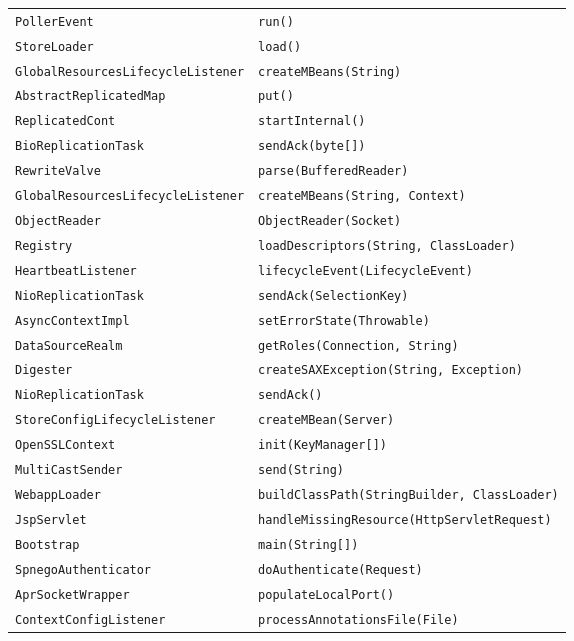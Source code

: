 \begin{center}
\begin{longtable}{ll}
\lstinline/PollerEvent/&{\lstinline/run()/}\\
\lstinline/StoreLoader/&{\lstinline/load()/}\\
\lstinline/GlobalResourcesLifecycleListener/&{\lstinline/createMBeans(String)/}\\
\lstinline/AbstractReplicatedMap/&{\lstinline/put()/}\\
\lstinline/ReplicatedCont/&{\lstinline/startInternal()/}\\
\lstinline/BioReplicationTask/&{\lstinline/sendAck(byte[])/}\\
\lstinline/RewriteValve/&{\lstinline/parse(BufferedReader)/}\\
\lstinline/GlobalResourcesLifecycleListener/&{\lstinline/createMBeans(String, Context)/}\\
\lstinline/ObjectReader/&{\lstinline/ObjectReader(Socket)/}\\
\lstinline/Registry/&{\lstinline/loadDescriptors(String, ClassLoader)/}\\
\lstinline/HeartbeatListener/&{\lstinline/lifecycleEvent(LifecycleEvent)/}\\
\lstinline/NioReplicationTask/&{\lstinline/sendAck(SelectionKey)/}\\
\lstinline/AsyncContextImpl/&{\lstinline/setErrorState(Throwable)/}\\
\lstinline/DataSourceRealm/&{\lstinline/getRoles(Connection, String)/}\\
\lstinline/Digester/&{\lstinline/createSAXException(String, Exception)/}\\
\lstinline/NioReplicationTask/&{\lstinline/sendAck()/}\\
\lstinline/StoreConfigLifecycleListener/&{\lstinline/createMBean(Server)/}\\
\lstinline/OpenSSLContext/&{\lstinline/init(KeyManager[])/}\\
\lstinline/MultiCastSender/&{\lstinline/send(String)/}\\
\lstinline/WebappLoader/&{\lstinline/buildClassPath(StringBuilder, ClassLoader)/}\\
\lstinline/JspServlet/&{\lstinline/handleMissingResource(HttpServletRequest)/}\\
\lstinline/Bootstrap/&{\lstinline/main(String[])/}\\
\lstinline/SpnegoAuthenticator/&{\lstinline/doAuthenticate(Request)/}\\
\lstinline/AprSocketWrapper/&{\lstinline/populateLocalPort()/}\\
\lstinline/ContextConfigListener/&{\lstinline/processAnnotationsFile(File)/}\\

\end{longtable}
\end{center}
